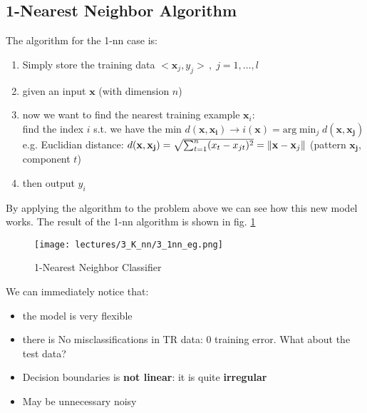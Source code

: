 \documentclass[../main.tex]{subfiles}
\begin{document}
\subsection{1-Nearest Neighbor Algorithm}
The algorithm for the 1-nn case is:
\begin{enumerate}
    \item Simply store the training data $<\mathbf{x}_j , y_j>\, ,\; j = 1, \dots, l$
    \item given an input $\mathbf{x}$ (with dimension $n$)
    \item now we want to find the nearest training example $\mathbf{x}_i$:\\
            find the index $i$ s.t. we have the min $d(\mathbf{x},\mathbf{x_i}) \rightarrow i(\mathbf{x}) = \mbox{arg}\min_{j} d(\mathbf{x},\mathbf{x_j})$\\
            e.g.  Euclidian distance: $d(\mathbf{x},\mathbf{x_j}) = \sqrt{\sum_{t = 1}^n (x_t - x_{jt})^2} = \left\lVert\mathbf{x} - \mathbf{x}_j\right\rVert $ (pattern $\mathbf{x_j}$, component $t$) 
    \item then output $y_i$
\end{enumerate}
By applying the algorithm to the problem above we can see how this new model works.
The result of the 1-nn algorithm is shown in fig. \ref{fig:3_1nn_eg}\\

\begin{figure}
    \centering
    \texttt{[image: lectures/3\_K\_nn/3\_1nn\_eg.png]}
    \caption{1-Nearest Neighbor Classifier}
    \label{fig:3_1nn_eg}
\end{figure}

We can immediately notice that:
\begin{itemize}
    \item the model is very flexible
    \item there is No misclassifications in TR data: $0$ training error. What about the test data?
    \item Decision boundaries is \textbf{not linear}: it is quite \textbf{irregular}
    \item May be unnecessary noisy 
\end{itemize}
\end{document}
